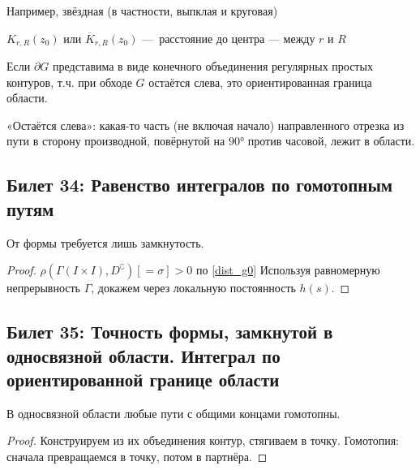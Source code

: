 \documentclass[12pt, a4paper, oneside]{memoir}
\begin{document}
\begin{example}
    Например, звёздная (в частности, выпклая и круговая)
\end{example}

\begin{definition}

    $K_{r, R}(z_0)$ или $\overline{K}_{r, R}(z_0)$ — расстояние до центра — между $r$ и $R$
\end{definition}


\begin{definition}

    Если $\partial G$ представима в виде конечного объединения регулярных простых контуров, 
    т.ч. при обходе $G$ остаётся слева, это ориентированная граница области.

    «Остаётся слева»: какая-то часть (не включая начало) направленного отрезка из пути в сторону производной, 
    повёрнутой на $90°$ против часовой, лежит в области.
\end{definition}


\subsection{Билет 34: Равенство интегралов по гомотопным путям}


\begin{theorem}

    От формы требуется лишь замкнутость.

    \begin{proof}
        $\rho\left(\Gamma(I×I), D^\complement\right) [ = \sigma] > 0$ по \ref{dist_g0}
        Используя равномерную непрерывность $\Gamma$, докажем через локальную постоянность $h(s)$.
    \end{proof}
\end{theorem}



\subsection{Билет 35: Точность формы, замкнутой в односвязной области. Интеграл по ориентированной границе области}

\begin{lemma}
    В односвязной области любые пути с общими концами гомотопны.

    \begin{proof}
        Конструируем из их объединения контур, стягиваем в точку.
        Гомотопия: сначала превращаемся в точку, потом в партнёра.
    \end{proof}
\end{lemma}
\end{document}
